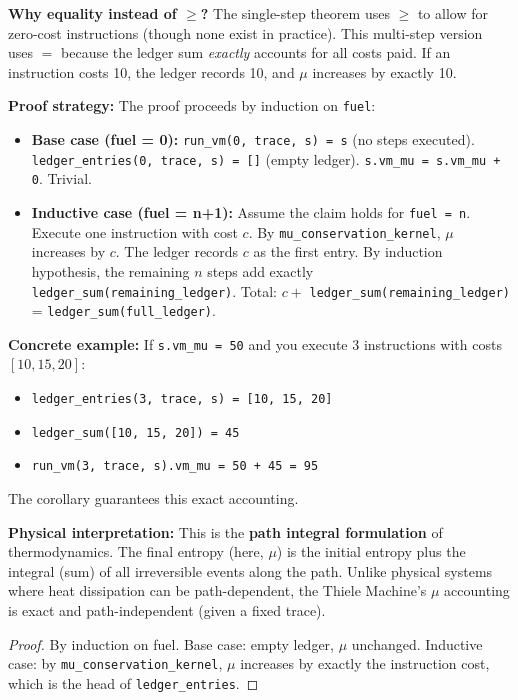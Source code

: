 \textbf{Why equality instead of $\geq$?} The single-step theorem uses $\geq$ to allow for zero-cost instructions (though none exist in practice). This multi-step version uses $=$ because the ledger sum \textit{exactly} accounts for all costs paid. If an instruction costs 10, the ledger records 10, and $\mu$ increases by exactly 10.

\textbf{Proof strategy:} The proof proceeds by induction on \texttt{fuel}:
\begin{itemize}
    \item \textbf{Base case (fuel = 0):} \texttt{run\_vm(0, trace, s) = s} (no steps executed). \texttt{ledger\_entries(0, trace, s) = []} (empty ledger). \texttt{s.vm\_mu = s.vm\_mu + 0}. Trivial.
    \item \textbf{Inductive case (fuel = n+1):} Assume the claim holds for \texttt{fuel = n}. Execute one instruction with cost $c$. By \texttt{mu\_conservation\_kernel}, $\mu$ increases by $c$. The ledger records $c$ as the first entry. By induction hypothesis, the remaining $n$ steps add exactly \texttt{ledger\_sum(remaining\_ledger)}. Total: $c +$ \texttt{ledger\_sum(remaining\_ledger)} = \texttt{ledger\_sum(full\_ledger)}.
\end{itemize}

\textbf{Concrete example:} If \texttt{s.vm\_mu = 50} and you execute 3 instructions with costs $[10, 15, 20]$:
\begin{itemize}
    \item \texttt{ledger\_entries(3, trace, s) = [10, 15, 20]}
    \item \texttt{ledger\_sum([10, 15, 20]) = 45}
    \item \texttt{run\_vm(3, trace, s).vm\_mu = 50 + 45 = 95}
\end{itemize}
The corollary guarantees this exact accounting.

\textbf{Physical interpretation:} This is the \textbf{path integral formulation} of thermodynamics. The final entropy (here, $\mu$) is the initial entropy plus the integral (sum) of all irreversible events along the path. Unlike physical systems where heat dissipation can be path-dependent, the Thiele Machine's $\mu$ accounting is exact and path-independent (given a fixed trace).


\begin{proof}
By induction on fuel. Base case: empty ledger, $\mu$ unchanged. Inductive case: by \texttt{mu\_conservation\_kernel}, $\mu$ increases by exactly the instruction cost, which is the head of \texttt{ledger\_entries}.
\end{proof}

